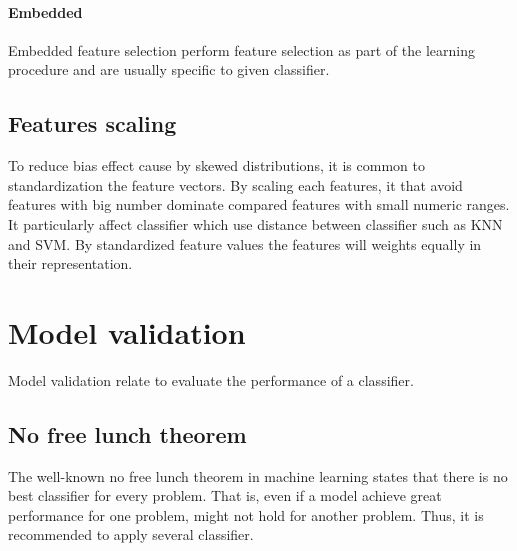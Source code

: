 \documentclass[USenglish]{ifimaster}  %
\begin{document}
	
	\paragraph{Embedded}
	Embedded feature selection perform feature selection as part of the learning procedure and are usually specific to given classifier.
	
	\subsection{Features scaling}
	\label{subsec:scaling}
	To reduce bias effect cause by skewed distributions, it is common to standardization the feature vectors. By scaling each features, it that avoid features with big number dominate compared features with small numeric ranges. It particularly affect classifier which use distance between classifier such as KNN and SVM.  By standardized feature values the features will weights equally in their representation.
	
	
	\section{Model validation}
	Model validation relate to evaluate the performance of a classifier. 
	
	\subsection{No free lunch theorem} \label{seq:nofree}
	The well-known no free lunch theorem\cite{NOFREELUNCH} in machine learning states that there is no best classifier for every problem. That is, even if a model achieve great performance for one problem, might not hold for another problem. Thus, it is recommended to apply several classifier.
	
\end{document}
